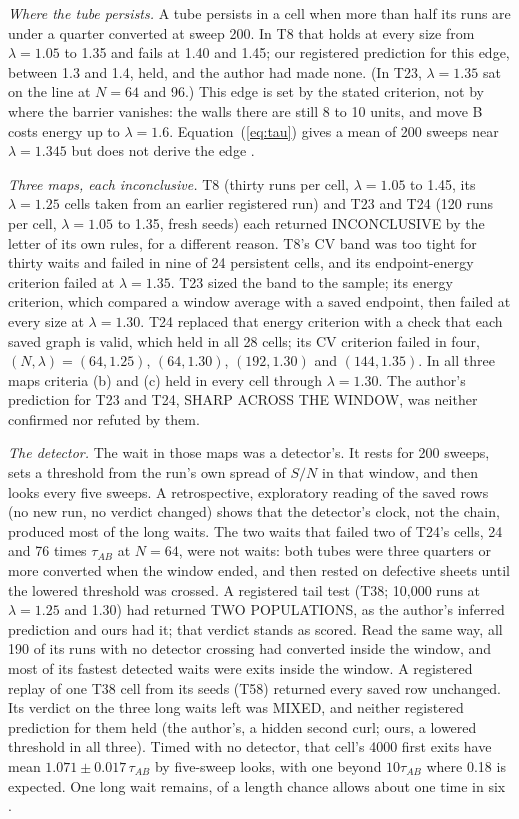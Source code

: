\documentclass[aps,pre,10pt,twocolumn,superscriptaddress,nofootinbib]{revtex4-2}
\begin{document}
\emph{Where the tube persists.} A tube persists in a cell when more than half its runs are under a quarter
converted at sweep 200. In T8 that holds at every size from $\lambda=1.05$ to 1.35 and fails at 1.40 and 1.45;
our registered prediction for this edge, between 1.3 and 1.4, held, and the author had made none.
(In T23, $\lambda=1.35$ sat on the line at $N=64$ and 96.) This edge is set by the stated criterion, not by
where the barrier vanishes: the walls there are still 8 to 10 units, and move B costs energy up to $\lambda=1.6$.
Equation~(\ref{eq:tau}) gives a mean of 200 sweeps near $\lambda=1.345$ but does not derive the edge
\cite{paper1}.

\emph{Three maps, each inconclusive.} T8 (thirty runs per cell, $\lambda=1.05$ to 1.45, its $\lambda=1.25$ cells taken from an earlier registered
run) and T23 and T24 (120
runs per cell, $\lambda=1.05$ to 1.35, fresh seeds) each returned INCONCLUSIVE by the letter of its own rules,
for a different reason. T8's CV band was too tight for thirty waits and failed in nine of 24 persistent cells,
and its endpoint-energy criterion failed at $\lambda=1.35$. T23 sized the band to the sample; its energy
criterion, which compared a window average with a saved endpoint, then failed at every size at $\lambda=1.30$.
T24 replaced that energy criterion with a check that each saved graph is valid, which held in all 28 cells; its
CV criterion failed in four,
$(N,\lambda)=(64,1.25)$, $(64,1.30)$, $(192,1.30)$ and $(144,1.35)$. In all three maps criteria (b) and (c)
held in every cell through $\lambda=1.30$. The author's prediction for T23 and T24, SHARP ACROSS THE WINDOW, was
neither confirmed nor refuted by them.

\emph{The detector.} The wait in those maps was a detector's. It rests for 200 sweeps, sets a threshold from the
run's own spread of $S/N$ in that window, and then looks every five sweeps. A retrospective, exploratory reading
of the saved rows (no new run, no verdict changed) shows that the detector's clock, not the chain, produced most
of the long waits. The two waits that failed two of T24's cells, 24 and 76 times $\tau_{AB}$ at $N=64$, were not
waits: both tubes were three quarters or more converted when the window ended, and then rested on defective
sheets until the lowered threshold was crossed. A registered tail test (T38; 10,000 runs at $\lambda=1.25$ and
1.30) had returned TWO POPULATIONS, as the author's inferred prediction and ours had it; that verdict stands as
scored. Read the same way, all 190 of its runs with no
detector crossing had converted inside the window, and most of its fastest detected waits were exits inside the
window. A
registered replay of one T38 cell from its seeds (T58) returned every saved row unchanged. Its verdict on the
three long waits left was MIXED, and neither registered prediction for them held (the author's, a hidden second
curl; ours, a lowered threshold in all three). Timed with no detector, that cell's 4000 first exits have mean
$1.071\pm0.017\,\tau_{AB}$ by five-sweep looks, with one beyond $10\tau_{AB}$ where 0.18 is expected. One long
wait remains, of a length chance allows about one time in six \cite{paper1}.
\end{document}
